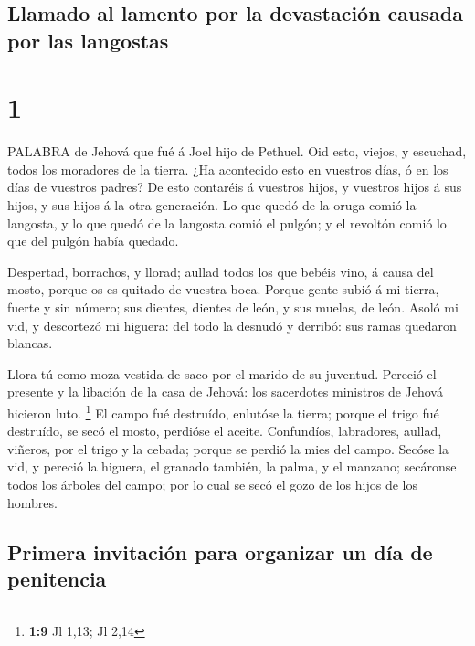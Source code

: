 \hypertarget{llamado-al-lamento-por-la-devastaciuxf3n-causada-por-las-langostas}{%
\subsection{Llamado al lamento por la devastación causada por las
langostas}\label{llamado-al-lamento-por-la-devastaciuxf3n-causada-por-las-langostas}}

\hypertarget{section}{%
\section{1}\label{section}}

 PALABRA de Jehová que fué á Joel hijo de Pethuel.
 Oid esto, viejos, y escuchad, todos los moradores de la
tierra. ¿Ha acontecido esto en vuestros días, ó en los días de vuestros
padres?  De esto contaréis á vuestros hijos, y vuestros
hijos á sus hijos, y sus hijos á la otra generación.  Lo que
quedó de la oruga comió la langosta, y lo que quedó de la langosta comió
el pulgón; y el revoltón comió lo que del pulgón había quedado.

 Despertad, borrachos, y llorad; aullad todos los que bebéis
vino, á causa del mosto, porque os es quitado de vuestra boca.
 Porque gente subió á mi tierra, fuerte y sin número; sus
dientes, dientes de león, y sus muelas, de león.  Asoló mi
vid, y descortezó mi higuera: del todo la desnudó y derribó: sus ramas
quedaron blancas.

 Llora tú como moza vestida de saco por el marido de su
juventud.  Pereció el presente y la libación de la casa de
Jehová: los sacerdotes ministros de Jehová hicieron luto. \footnote{\textbf{1:9}
  Jl 1,13; Jl 2,14}  El campo fué destruído, enlutóse la
tierra; porque el trigo fué destruído, se secó el mosto, perdióse el
aceite.  Confundíos, labradores, aullad, viñeros, por el
trigo y la cebada; porque se perdió la mies del campo. 
Secóse la vid, y pereció la higuera, el granado también, la palma, y el
manzano; secáronse todos los árboles del campo; por lo cual se secó el
gozo de los hijos de los hombres.

\hypertarget{primera-invitaciuxf3n-para-organizar-un-duxeda-de-penitencia}{%
\subsection{Primera invitación para organizar un día de
penitencia}\label{primera-invitaciuxf3n-para-organizar-un-duxeda-de-penitencia}}

